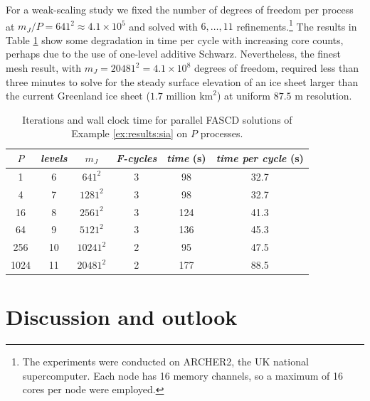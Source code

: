 \documentclass[review,hidelinks,onefignum,onetabnum]{siamart220329}
\begin{document}
\begin{example}
For a weak-scaling study we fixed the number of degrees of freedom per process at $m_J/P=641^2 \approx 4.1 \times 10^5$ and solved with $6, \dots, 11$ refinements.\footnote{The experiments were conducted on ARCHER2, the UK national supercomputer. Each node has 16 memory channels, so a maximum of 16 cores per node were employed.}  The results in Table \ref{tab:results:siaweak} show some degradation in time per cycle with increasing core counts, perhaps due to the use of one-level additive Schwarz.  Nevertheless, the finest mesh result, with $m_J=20481^2=4.1 \times 10^8$ degrees of freedom, required less than three minutes to solve for the steady surface elevation of an ice sheet larger than the current Greenland ice sheet ($1.7$ million $\text{km}^2$) at uniform $87.5$ m resolution.

\begin{table}[ht]
\centering
\begin{tabular}{c@{\hskip 4mm}c@{\hskip 4mm}c@{\hskip 7mm}c@{\hskip 4mm}cc}
\toprule
$P$ & \emph{levels} & $m_J$ & \emph{F-cycles} & \emph{time} (s) & \emph{time per cycle} (s) \\
\midrule
 1 & 6 & $641^2$ & 3 & 98 & 32.7 \\
 4 & 7 & $1281^2$ & 3 & 98 & 32.7 \\
 16 & 8 & $2561^2$ & 3 & 124 & 41.3 \\
 64 & 9 & $5121^2$ & 3 & 136 & 45.3 \\
 256 & 10 & $10241^2$ & 2 & 95 & 47.5 \\
 1024 & 11 & $20481^2$ & 2 & 177 & 88.5 \\
 \bottomrule
\end{tabular}
\bigskip
\caption{Iterations and wall clock time for parallel FASCD solutions of Example \ref{ex:results:sia} on $P$ processes.}
\label{tab:results:siaweak}
\end{table}
\end{example}


\section{Discussion and outlook} \label{sec:discussion}
\end{document}
